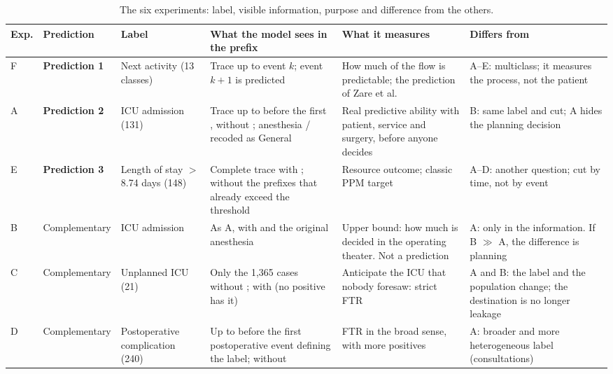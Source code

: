 \begin{table}[htbp]
\centering
\caption{The six experiments: label, visible information, purpose and difference from the others.}
\label{tab:logica}
\footnotesize
\begin{tabular}{L{0.6cm}L{1.9cm}L{2.2cm}L{3.0cm}L{2.7cm}L{2.6cm}}
\toprule
Exp. & Prediction & Label & What the model sees in the prefix & What it measures & Differs from \\
\midrule
F & \textbf{Prediction 1} & Next activity (13 classes) & Trace up to event $k$; event $k+1$ is predicted & How much of the flow is predictable; the prediction of Zare et al. & A--E: multiclass; it measures the process, not the patient \\
\addlinespace
A & \textbf{Prediction 2} & ICU admission (131) & Trace up to before the first , without ; anesthesia / recoded as General & Real predictive ability with patient, service and surgery, before anyone decides & B: same label and cut; A hides the planning decision \\
\addlinespace
E & \textbf{Prediction 3} & Length of stay $>$ 8.74 days (148) & Complete trace with ; without the prefixes that already exceed the threshold & Resource outcome; classic PPM target & A--D: another question; cut by time, not by event \\
\addlinespace
B & Comple\-mentary & ICU admission & As A, with  and the original anesthesia & Upper bound: how much is decided in the operating theater. Not a prediction & A: only in the information. If B $\gg$ A, the difference is planning \\
\addlinespace
C & Comple\-mentary & Unplanned ICU (21) & Only the 1,365 cases without ; with  (no positive has it) & Anticipate the ICU that nobody foresaw: strict FTR & A and B: the label and the population change; the destination is no longer leakage \\
\addlinespace
D & Comple\-mentary & Postoperative complication (240) & Up to before the first postoperative event defining the label; without  & FTR in the broad sense, with more positives & A: broader and more heterogeneous label (consultations) \\
\bottomrule
\end{tabular}
\end{table}


